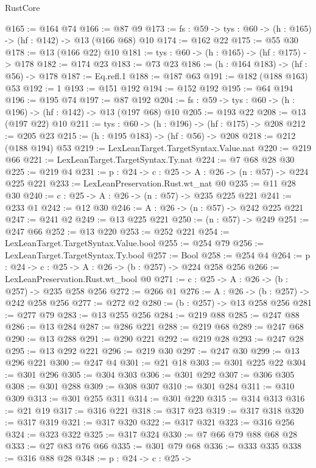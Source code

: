 \begin{lexlean}{RustCore}
\begin{coremodule}
@165 := @164 @74
@166 := @87 @9
@173 := {fs : @59} -> {tys : @60} -> (h : @165) -> (hf : @142) -> @13 (@166 @68) @10
@174 := @162 @22
@175 := @55 @30
@178 := @13 (@166 @22) @10
@181 := {tys : @60} -> (h : @165) -> (hf : @175) -> @178
@182 := @174 @23
@183 := @73 @23
@186 := (h : @164 @183) -> (hf : @56) -> @178
@187 := Eq.refl.{1}
@188 := @187 @63
@191 := @182 (@188 @163) @53
@192 := 1
@193 := @151 @192
@194 := @152 @192
@195 := @64 @194
@196 := @195 @74
@197 := @87 @192
@204 := {fs : @59} -> {tys : @60} -> (h : @196) -> (hf : @142) -> @13 (@197 @68) @10
@205 := @193 @22
@208 := @13 (@197 @22) @10
@211 := {tys : @60} -> (h : @196) -> (hf : @175) -> @208
@212 := @205 @23
@215 := (h : @195 @183) -> (hf : @56) -> @208
@218 := @212 (@188 @194) @53
@219 := LexLeanTarget.TargetSyntax.Value.nat
@220 := @219 @66
@221 := LexLeanTarget.TargetSyntax.Ty.nat
@224 := @7 @68 @28 @30
@225 := @219 @4
@231 := {p : @24} -> {c : @25} -> {A : @26} -> (n : @57) -> @224 @225 @221
@233 := LexLeanPreservation.Rust.wt_nat @0
@235 := @11 @28 @30
@240 := {c : @25} -> {A : @26} -> (n : @57) -> @235 @225 @221
@241 := @233 @1
@242 := @12 @30
@246 := {A : @26} -> (n : @57) -> @242 @225 @221
@247 := @241 @2
@249 := @13 @225 @221
@250 := (n : @57) -> @249
@251 := @247 @66
@252 := @13 @220
@253 := @252 @221
@254 := LexLeanTarget.TargetSyntax.Value.bool
@255 := @254 @79
@256 := LexLeanTarget.TargetSyntax.Ty.bool
@257 := Bool
@258 := @254 @4
@264 := {p : @24} -> {c : @25} -> {A : @26} -> (b : @257) -> @224 @258 @256
@266 := LexLeanPreservation.Rust.wt_bool @0
@271 := {c : @25} -> {A : @26} -> (b : @257) -> @235 @258 @256
@272 := @266 @1
@276 := {A : @26} -> (b : @257) -> @242 @258 @256
@277 := @272 @2
@280 := (b : @257) -> @13 @258 @256
@281 := @277 @79
@283 := @13 @255 @256
@284 := @219 @88
@285 := @247 @88
@286 := @13 @284
@287 := @286 @221
@288 := @219 @68
@289 := @247 @68
@290 := @13 @288
@291 := @290 @221
@292 := @219 @28
@293 := @247 @28
@295 := @13 @292 @221
@296 := @219 @30
@297 := @247 @30
@299 := @13 @296 @221
@300 := @247 @4
@301 := @21 @18
@303 := @301 @225 @22
@304 := @301 @296
@305 := @304 @303
@306 := @301 @292
@307 := @306 @305
@308 := @301 @288
@309 := @308 @307
@310 := @301 @284
@311 := @310 @309
@313 := @301 @255 @311
@314 := @301 @220
@315 := @314 @313
@316 := @21 @19
@317 := @316 @221
@318 := @317 @23
@319 := @317 @318
@320 := @317 @319
@321 := @317 @320
@322 := @317 @321
@323 := @316 @256
@324 := @323 @322
@325 := @317 @324
@330 := @7 @66 @79 @88 @68 @28
@333 := @27 @83 @76 @66
@335 := @301 @79 @68
@336 := @333 @335
@338 := @316 @88 @28
@348 := {p : @24} ->
  {c : @25} ->

\end{coremodule}
\end{lexlean}
